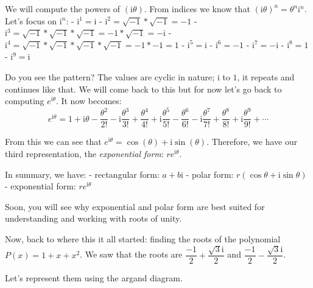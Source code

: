 \documentclass[11pt]{article}
\begin{document}
We will compute the powers of \((\mathrm{i}\theta)\). From indices we
know that \((\mathrm{i}\theta)^n = \theta^n\mathrm{i}^n\). Let's focus
on \(\mathrm{i}^n\): - \(\mathrm{i}^1 = \mathrm{i}\) -
\(\mathrm{i}^2 = \sqrt{-1} \ast \sqrt{-1} = -1\) -
\(\mathrm{i}^3 = \sqrt{-1} \ast \sqrt{-1} \ast \sqrt{-1} = -1 \ast \sqrt{-1} =  -\mathrm{i}\)
-
\(\mathrm{i}^4 = \sqrt{-1} \ast \sqrt{-1} \ast \sqrt{-1} \ast \sqrt{-1} = -1 \ast -1 = 1\)
- \(\mathrm{i}^5 = \mathrm{i}\) - \(\mathrm{i}^6 = -1\) -
\(\mathrm{i}^7 = -\mathrm{i}\) - \(\mathrm{i}^8 = 1\) -
\(\mathrm{i}^9 = \mathrm{i}\)

Do you see the pattern? The values are cyclic in nature; \(\mathrm{i}\)
to \(1\), it repeats and continues like that. We will come back to this
but for now let's go back to computing \(e^{\mathrm{i}\theta}\). It now
becomes:
\[e^{\mathrm{i}\theta} = 1 + \mathrm{i}\theta - \frac{\theta^2}{2!} - \mathrm{i}\frac{\theta^3}{3!} + \frac{\theta^4}{4!} + \mathrm{i}\frac{\theta^5}{5!} - \frac{\theta^6}{6!} - \mathrm{i}\frac{\theta^7}{7!} + \frac{\theta^8}{8!} + \mathrm{i}\frac{\theta^9}{9!} + \cdots\]

From this we can see that
\(e^{\mathrm{i}\theta} = \cos(\theta) + \mathrm{i}\sin(\theta)\).
Therefore, we have our third representation, the \emph{exponential
form}: \(re^{\mathrm{i}\theta}\).

In summary, we have: - rectangular form: \(a + b\mathrm{i}\) - polar
form: \(r(\cos\theta + \mathrm{i}\sin\theta)\) - exponential form:
\(re^{\mathrm{i}\theta}\)

Soon, you will see why exponential and polar form are best suited for
understanding and working with roots of unity.

Now, back to where this it all started: finding the roots of the
polynomial \(P(x) = 1 + x + x^2\). We saw that the roots are
\(\dfrac{-1}{2} + \dfrac{\sqrt{3}\mathrm{i}}{2}\) and
\(\dfrac{-1}{2} - \dfrac{\sqrt{3}\mathrm{i}}{2}\).

Let's represent them using the argand diagram.

    \begin{center}
    \end{center}
    { \hspace*{\fill} \\}
    
\end{document}
